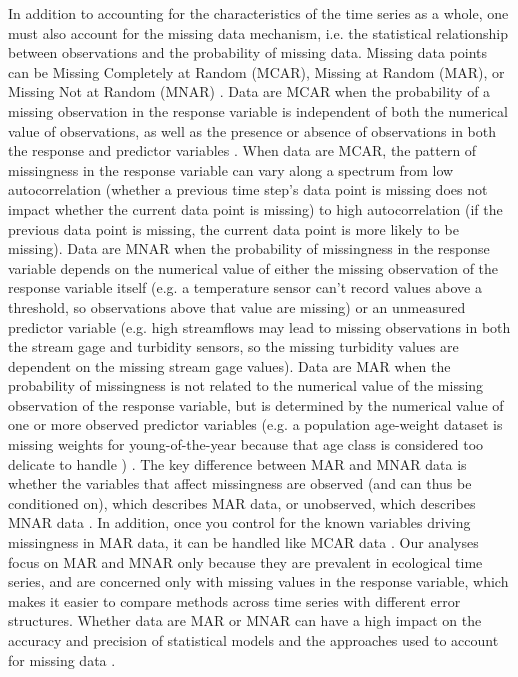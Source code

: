 \documentclass{article}
\begin{document}
In addition to accounting for the characteristics of the time series as a whole, one must also account for the missing data mechanism, i.e. the statistical relationship between observations and the probability of missing data. Missing data points can be Missing Completely at Random (MCAR), Missing at Random (MAR), or Missing Not at Random (MNAR) \citep[][Fig. \ref{fig:missingtypes}]{rubin_inference_1976, nakagawa_missing_2015}. Data are MCAR when the probability of a missing observation in the response variable is independent of both the numerical value of observations, as well as the presence or absence of observations in both the response and predictor variables  \citep{nakagawa_missing_2015, horton2007much, newman_missing_2014}. When data are MCAR, the pattern of missingness in the response variable can vary along a spectrum from low autocorrelation (whether a previous time step's data point is missing does not impact whether the current data point is missing) to high autocorrelation (if the previous data point is missing, the current data point is more likely to be missing). Data are MNAR when the probability of missingness in the response variable depends on the numerical value of either the missing observation of the response variable itself (e.g. a temperature sensor can't record values above a threshold, so observations above that value are missing) or an unmeasured predictor variable (e.g.  high streamflows may lead to missing observations in both the stream gage and turbidity sensors, so the missing turbidity values are dependent on the missing stream gage values). Data are MAR when the probability of missingness is not related to the numerical value of the missing observation of the response variable, but is determined by the numerical value of one or more observed predictor variables (e.g. a population age-weight dataset is  missing weights for young-of-the-year because that age class is considered  too delicate to handle ) \citep{newman_missing_2014, ellington_using_2015, nakagawa_missing_2015}. The key difference between MAR and MNAR data is whether the variables that affect missingness are observed (and can thus be conditioned on), which describes MAR data, or unobserved, which describes MNAR data \citep{nakagawa_model_2011}. In addition, once you control for the known variables driving missingness in MAR data, it can be handled like MCAR data \citep{nakagawa_missing_2015}. Our analyses focus on MAR and MNAR only because they are prevalent in ecological time series, and are concerned only with missing values in the response variable, which makes it easier to compare methods across time series with different error structures. Whether data are MAR or MNAR can have a high impact on the accuracy and precision of statistical models and the approaches used to account for missing data \citep{newman_missing_2014, dong2013principled}. 
\end{document}
